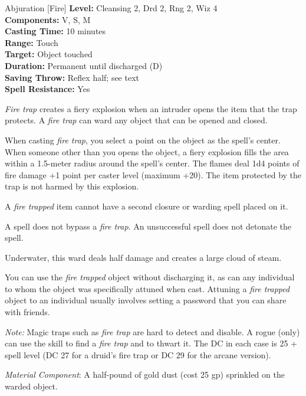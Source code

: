 {Abjuration [Fire]}
{
	\textbf{Level:}
	Cleansing 2, Drd 2, Rng 2, Wiz 4\\
	\textbf{Components:}
	V, S, M\\
	\textbf{Casting Time:}
	10 minutes\\
	\textbf{Range:}
	Touch\\
	\textbf{Target:}
	Object touched\\
	\textbf{Duration:}
	Permanent until discharged (D)\\
	\textbf{Saving Throw:}
	Reflex half; see text\\
	\textbf{Spell Resistance:}
	Yes\\
}
{
	\emph{Fire trap} creates a fiery explosion when an intruder opens the item that the trap protects. A \emph{fire trap} can ward any object that can be opened and closed.

	When casting \emph{fire trap}, you select a point on the object as the spell's center. When someone other than you opens the object, a fiery explosion fills the area within a 1.5-meter radius around the spell's center. The flames deal 1d4 points of fire damage +1 point per caster level (maximum +20). The item protected by the trap is not harmed by this explosion.

	A \emph{fire trapped} item cannot have a second closure or warding spell placed on it.

	A  spell does not bypass a \emph{fire trap}.  An unsuccessful  spell does not detonate the spell.

	Underwater, this ward deals half damage and creates a large cloud of steam.

	You can use the \emph{fire trapped} object without discharging it, as can any individual to whom the object was specifically attuned when cast. Attuning a \emph{fire trapped} object to an individual usually involves setting a password that you can share with friends.

	\textit{Note:} Magic traps such as \emph{fire trap} are hard to detect and disable. A rogue (only) can use the  skill to find a \emph{fire trap} and  to thwart it. The DC in each case is 25 + spell level (DC 27 for a druid's fire trap or DC 29 for the arcane version).

	\textit{Material Component}:
	A half-pound of gold dust (cost 25 gp) sprinkled on the warded object.

}
